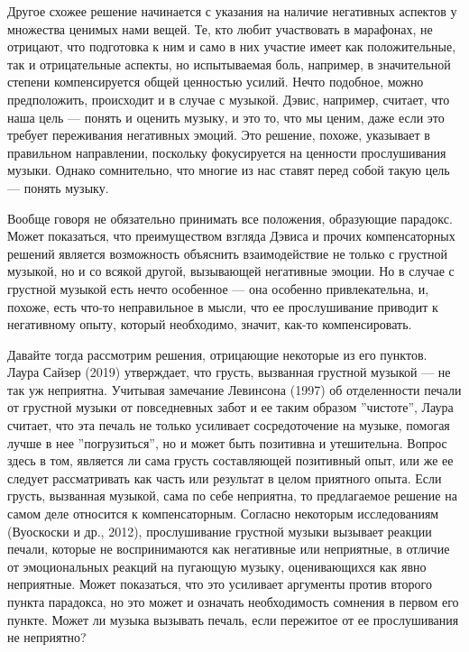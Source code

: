 \documentclass[11pt]{book}
\begin{document}
Другое схожее решение начинается с указания на наличие негативных аспектов у множества ценимых нами вещей. Те, кто любит участвовать в марафонах, не отрицают, что подготовка к ним и само в них участие имеет как положительные, так и отрицательные аспекты, но испытываемая боль, например, в значительной степени компенсируется общей ценностью усилий. Нечто подобное, можно предположить, происходит и в случае с музыкой. Дэвис, например, считает, что наша цель --- понять и оценить музыку, и это то, что мы ценим, даже если это требует переживания негативных эмоций. Это решение, похоже, указывает в правильном направлении, поскольку фокусируется на ценности прослушивания музыки. Однако сомнительно, что многие из нас ставят перед собой такую цель --- понять музыку.

Вообще говоря не обязательно принимать все положения, образующие парадокс. Может показаться, что преимуществом взгляда Дэвиса и прочих компенсаторных решений является возможность объяснить взаимодействие не только с грустной музыкой, но и со всякой другой, вызывающей негативные эмоции. Но в случае с грустной музыкой есть нечто особенное --- она особенно привлекательна, и, похоже, есть что-то неправильное в мысли, что ее прослушивание приводит к негативному опыту, который необходимо, значит, как-то компенсировать.

Давайте тогда рассмотрим решения, отрицающие некоторые из его пунктов. Лаура Сайзер (2019) утверждает, что грусть, вызванная грустной музыкой --- не так уж неприятна. Учитывая замечание Левинсона (1997) об отделенности печали от грустной музыки от повседневных забот и ее таким образом ''чистоте'', Лаура считает, что эта печаль не только усиливает сосредоточение на музыке, помогая лучше в нее ''погрузиться'', но и может быть позитивна и утешительна. Вопрос здесь в том, является ли сама грусть составляющей позитивный опыт, или же ее следует рассматривать как часть или результат в целом приятного опыта. Если грусть, вызванная музыкой, сама по себе неприятна, то предлагаемое решение на самом деле относится к компенсаторным. Согласно некоторым исследованиям (Вуоскоски и др., 2012), прослушивание грустной музыки вызывает реакции печали, которые не воспринимаются как негативные или неприятные, в отличие от эмоциональных реакций на пугающую музыку, оценивающихся как явно неприятные. Может показаться, что это усиливает аргументы против второго пункта парадокса, но это может и означать необходимость сомнения в первом его пункте. Может ли музыка вызывать печаль, если пережитое от ее прослушивания не неприятно?
\end{document}
